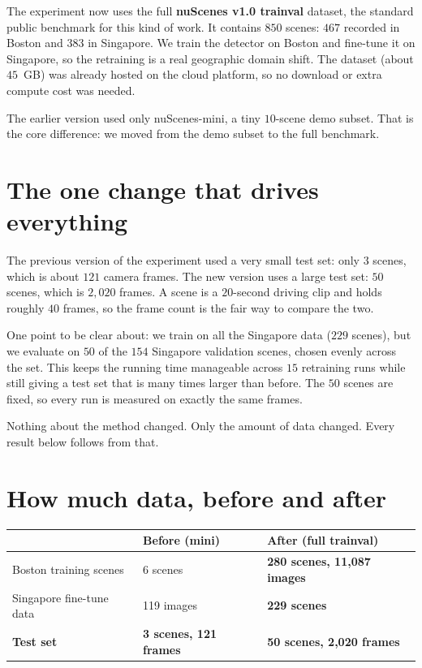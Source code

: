 \documentclass[11pt,a4paper]{article}
\begin{document}
The experiment now uses the full \textbf{nuScenes v1.0 trainval} dataset, the
standard public benchmark for this kind of work. It contains $850$ scenes:
$467$ recorded in Boston and $383$ in Singapore. We train the detector on Boston
and fine-tune it on Singapore, so the retraining is a real geographic domain
shift. The dataset (about $45$~GB) was already hosted on the cloud platform, so
no download or extra compute cost was needed.

The earlier version used only nuScenes-mini, a tiny $10$-scene demo subset. That
is the core difference: we moved from the demo subset to the full benchmark.

\section{The one change that drives everything}

The previous version of the experiment used a very small test set: only $3$
scenes, which is about $121$ camera frames. The new version uses a large test
set: $50$ scenes, which is $2{,}020$ frames. A scene is a $20$-second driving
clip and holds roughly $40$ frames, so the frame count is the fair way to
compare the two.

One point to be clear about: we train on all the Singapore data ($229$ scenes),
but we evaluate on $50$ of the $154$ Singapore validation scenes, chosen evenly
across the set. This keeps the running time manageable across $15$ retraining
runs while still giving a test set that is many times larger than before. The
$50$ scenes are fixed, so every run is measured on exactly the same frames.

Nothing about the method changed. Only the amount of data changed. Every result
below follows from that.

\section{How much data, before and after}

\begin{table}[h!]
\centering
\renewcommand{\arraystretch}{1.3}
\begin{tabular}{@{}L{4.6cm}C{3.7cm}C{4.6cm}@{}}
\toprule
 & \textbf{Before (mini)} & \textbf{After (full trainval)} \\
\midrule
Boston training scenes   & 6 scenes    & \textbf{280 scenes, 11{,}087 images} \\
Singapore fine-tune data & 119 images  & \textbf{229 scenes} \\
\textbf{Test set}        & \textbf{3 scenes, 121 frames} & \textbf{50 scenes, 2{,}020 frames} \\
\bottomrule
\end{tabular}
\end{table}
\end{document}
